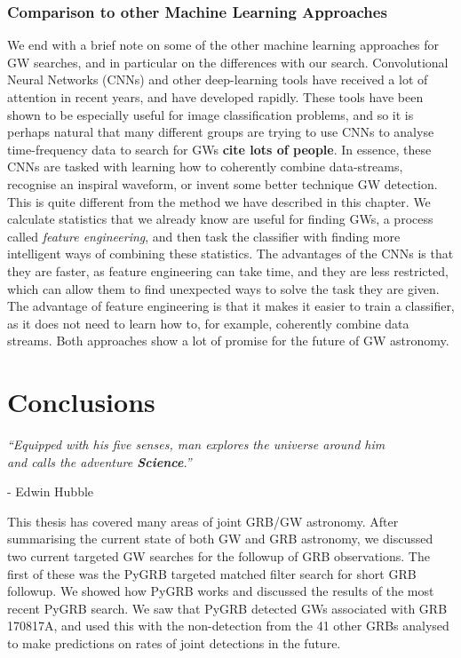\documentclass[11pt]{cuthesis}
\begin{document}
\subsection{Comparison to other Machine Learning Approaches}
We end with a brief note on some of the other machine learning approaches for GW searches, and in particular on the differences with our search. Convolutional Neural Networks (CNNs) and other deep-learning tools have received a lot of attention in recent years, and have developed rapidly. These tools have been shown to be especially useful for image classification problems, and so it is perhaps natural that many different groups are trying to use CNNs to analyse time-frequency data to search for GWs \textbf{cite lots of people}. In essence, these CNNs are tasked with learning how to coherently combine data-streams, recognise an inspiral waveform, or invent some better technique GW detection. This is quite different from the method we have described in this chapter. We calculate statistics that we already know are useful for finding GWs, a process called \textit{feature engineering}, and then task the classifier with finding more intelligent ways of combining these statistics. The advantages of the CNNs is that they are faster, as feature engineering can take time, and they are less restricted, which can allow them to find unexpected ways to solve the task they are given. The advantage of feature engineering is that it makes it easier to train a classifier, as it does not need to learn how to, for example, coherently combine data streams. Both approaches show a lot of promise for the future of GW astronomy. 


\chapter{Conclusions}
\begin{center}

\textit{``Equipped with his five senses, man explores the universe around him\\ and calls the adventure \textbf{Science}.''}
\end{center}
\begin{flushright}

- Edwin Hubble
\end{flushright}

\vspace{20pt}


This thesis has covered many areas of joint GRB/GW astronomy. After summarising the current state of both GW and GRB astronomy, we discussed two current targeted GW searches for the followup of GRB observations. The first of these was the PyGRB targeted matched filter search for short GRB followup. We showed how PyGRB works and discussed the results of the most recent PyGRB search. We saw that PyGRB detected GWs associated with GRB 170817A, and used this with the non-detection from the 41 other GRBs analysed to make predictions on rates of joint detections in the future. 
\end{document}
